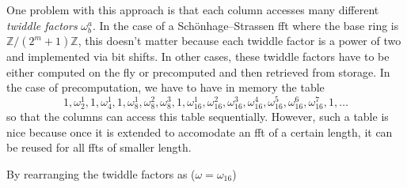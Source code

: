 \documentclass[12 pt]{amsart}
\newcommand{\om}[2] {\omega_{#1}^{#2}}
\begin{document}
One problem with this approach is that each column accesses many different
\emph{twiddle factors} $\omega_b^a$. In the case of a Sch\"onhage--Strassen fft where the base
ring is $\mathbb{Z}/(2^{m}+1)\mathbb{Z}$, this doesn't matter because each twiddle factor is a
power of two and implemented via bit shifts. In other cases, these twiddle factors have to be
either computed on the fly or precomputed and then retrieved from storage. In the case of precomputation,
we have to have in memory the table
\begin{equation*}
1,\om{2}{1}, 1,\om{4}{1}, 1, \om{8}{1}, \om{8}{2}, \om{8}{3}, 1, \om{16}{1}, \om{16}{2}, \om{16}{3}, \om{16}{4}, \om{16}{5}, \om{16}{6}, \om{16}{7}, 1, \dots
\end{equation*}
so that the columns can access this table sequentially. However, such a table is nice because
once it is extended to accomodate an fft of a certain length, it can be reused for all ffts of
smaller length.

By rearranging the twiddle factors as ($\omega = \omega_{16}$)
\end{document}
